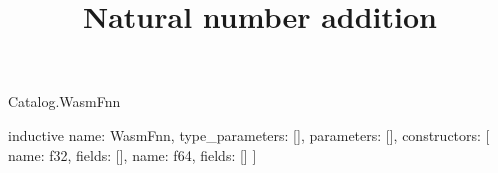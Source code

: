 \begin{lexlean}{Catalog.WasmFnn}
\title{Natural number addition}
\begin{semanticmodule}
inductive{
  name: WasmFnn,
  type_parameters: [],
  parameters: [],
  constructors: [
    {name: f32, fields: []},
    {name: f64, fields: []}
  ]
}
\end{semanticmodule}
\end{lexlean}
